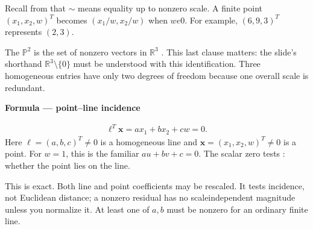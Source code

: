 \documentclass[letterpaper,11pt,english,openany,oneside]{jupyterBook}
\begin{document}
\sphinxAtStartPar
Recall from {\hyperref[\detokenize{foundations/notation:notation}]{}} that \(\sim\) means equality up to nonzero scale. A finite point \((x_1,x_2,w)^T\) becomes \((x_1/w,x_2/w)\) when \(w
e0\). For example, \((6,9,3)^T\) represents \((2,3)\).

\sphinxAtStartPar
The  \(\mathbb P^2\) is the set of nonzero vectors in \(\mathbb R^3\) . This last clause matters: the slide’s shorthand \(\mathbb R^3\setminus\{0\}\) must be understood with this identification. Three homogeneous entries have only two degrees of freedom because one overall scale is redundant.

\ignorespaces
{}\ignorespaces
{}\ignorespaces
{}\ignorespaces
\begin{TextbookBox}
\textbf{Formula — point–line incidence}\par\smallskip
\begin{equation}\label{equation:lectures/lecture01/projective:eq-lec01-incidence}
\begin{split}\boldsymbol\ell^T\mathbf{x}=a x_1+b x_2+c w=0.\end{split}
\end{equation}
\sphinxAtStartPar
Here \(\boldsymbol\ell=(a,b,c)^T\ne0\) is a homogeneous line and \(\mathbf{x}=(x_1,x_2,w)^T\ne0\) is a point. For \(w=1\), this is the familiar \(au+bv+c=0\). The scalar zero tests : whether the point lies on the line.

\sphinxAtStartPar
{} This is exact. Both line and point coefficients may be rescaled. It tests incidence, not Euclidean distance; a nonzero residual has no scale\sphinxhyphen{}independent magnitude unless you normalize it. At least one of \(a,b\) must be nonzero for an ordinary finite line.

\end{TextbookBox}
\end{document}
